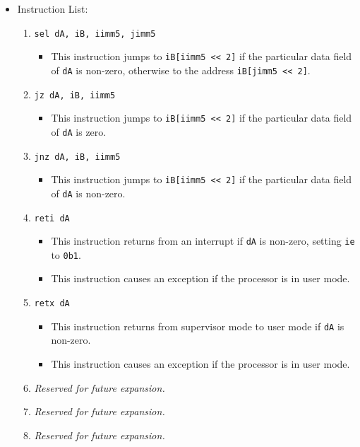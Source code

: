 \documentclass{article}
\begin{document}
\begin{itemize}
		\item Instruction List:
			\begin{enumerate}
			\item \texttt{sel dA, iB, iimm5, jimm5}
				\begin{itemize}
				\item This instruction jumps to \texttt{iB[iimm5 << 2]} if
				the particular data field of \texttt{dA}
				is non-zero, otherwise to the address \texttt{iB[jimm5 <<
				2]}.
				\end{itemize}
			\item \texttt{jz dA, iB, iimm5}
				\begin{itemize}
				\item This instruction jumps to \texttt{iB[iimm5 << 2]}
				if the particular data field of \texttt{dA} is zero.
				\end{itemize}
			\item \texttt{jnz dA, iB, iimm5}
				\begin{itemize}
				\item This instruction jumps to \texttt{iB[iimm5 << 2]}
				if the particular data field of \texttt{dA} is non-zero.
				\end{itemize}
			\item \texttt{reti dA}
				\begin{itemize}
				\item This instruction returns from an interrupt if
				\texttt{dA} is non-zero, setting \texttt{ie} to
				\texttt{0b1}.

				\item This instruction causes an exception if the processor
				is in user mode.
				\end{itemize}

			\item \texttt{retx dA}
				\begin{itemize}
				\item This instruction returns from supervisor mode to user
				mode if \texttt{dA} is non-zero.

				\item This instruction causes an exception if the processor
				is in user mode.
				\end{itemize}
			\item \textit{Reserved for future expansion.}
			\item \textit{Reserved for future expansion.}
			\item \textit{Reserved for future expansion.}


\end{enumerate}
\end{itemize}
\end{document}
